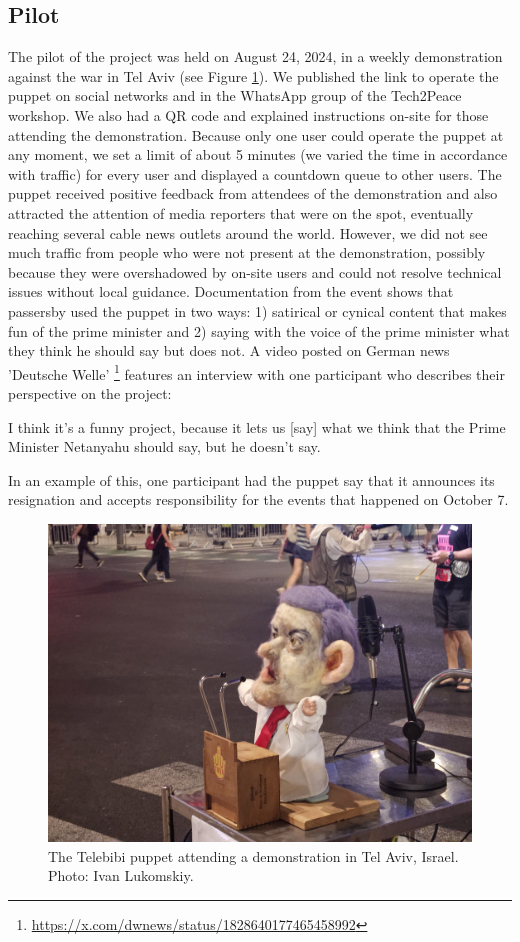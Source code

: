 \documentclass[dissertation,math,vertlayout,pdfa,colorlinks,nologo]{aaltoseries}
\begin{document}
\subsection{Pilot}
The pilot of the project was held on August 24, 2024, in a weekly demonstration against the war in Tel Aviv (see Figure \ref{fig:telebibi-pilot}). We published the link to operate the puppet on social networks and in the WhatsApp group of the Tech2Peace workshop. We also had a QR code and explained instructions on-site for those attending the demonstration. Because only one user could operate the puppet at any moment, we set a limit of about 5 minutes (we varied the time in accordance with traffic) for every user and displayed a countdown queue to other users. The puppet received positive feedback from attendees of the demonstration and also attracted the attention of media reporters that were on the spot, eventually reaching several cable news outlets around the world. However, we did not see much traffic from people who were not present at the demonstration, possibly because they were overshadowed by on-site users and could not resolve technical issues without local guidance. Documentation from the event shows that passersby used the puppet in two ways: 1) satirical or cynical content that makes fun of the prime minister and 2) saying with the voice of the prime minister what they think he should say but does not. A video posted on German news 'Deutsche Welle' \footnote{\url{https://x.com/dwnews/status/1828640177465458992}} features an interview with one participant who describes their perspective on the project:
\begin{displayquote}
    I think it's a funny project, because it lets us [say] what we think that the Prime Minister Netanyahu should say, but he doesn't say.
\end{displayquote}
In an example of this, one participant had the puppet say that it announces its resignation and accepts responsibility for the events that happened on October 7.


\begin{figure}
    \includegraphics[width=1\linewidth]{telebibi.jpg}
    \caption{The Telebibi puppet attending a demonstration in Tel Aviv, Israel. Photo: Ivan Lukomskiy.}
    \label{fig:telebibi-pilot}
\end{figure}
\end{document}

